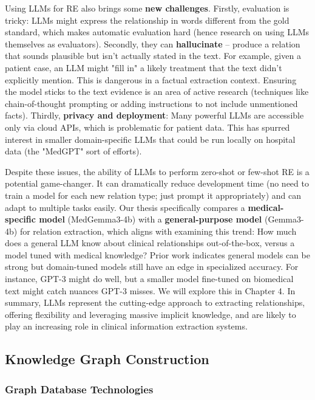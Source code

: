Using LLMs for RE also brings some \textbf{new challenges}. Firstly, evaluation is tricky: LLMs might express the relationship in words different from the gold standard, which makes automatic evaluation hard (hence research on using LLMs themselves as evaluators). Secondly, they can \textbf{hallucinate} – produce a relation that sounds plausible but isn't actually stated in the text. For example, given a patient case, an LLM might "fill in" a likely treatment that the text didn't explicitly mention. This is dangerous in a factual extraction context. Ensuring the model sticks to the text evidence is an area of active research (techniques like chain-of-thought prompting or adding instructions to not include unmentioned facts). Thirdly, \textbf{privacy and deployment}: Many powerful LLMs are accessible only via cloud APIs, which is problematic for patient data. This has spurred interest in smaller domain-specific LLMs that could be run locally on hospital data (the "MedGPT" sort of efforts).

Despite these issues, the ability of LLMs to perform zero-shot or few-shot RE is a potential game-changer. It can dramatically reduce development time (no need to train a model for each new relation type; just prompt it appropriately) and can adapt to multiple tasks easily. Our thesis specifically compares a \textbf{medical-specific model} (MedGemma3-4b) with a \textbf{general-purpose model} (Gemma3-4b) for relation extraction, which aligns with examining this trend: How much does a general LLM know about clinical relationships out-of-the-box, versus a model tuned with medical knowledge? Prior work indicates general models can be strong but domain-tuned models still have an edge in specialized accuracy. For instance, GPT-3 might do well, but a smaller model fine-tuned on biomedical text might catch nuances GPT-3 misses. We will explore this in Chapter 4. In summary, LLMs represent the cutting-edge approach to extracting relationships, offering flexibility and leveraging massive implicit knowledge, and are likely to play an increasing role in clinical information extraction systems.

\subsection{Knowledge Graph Construction}

\subsubsection{Graph Database Technologies}

